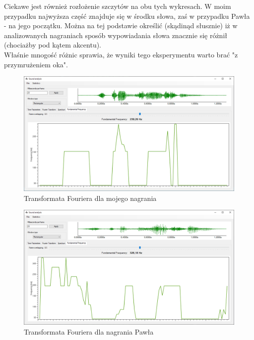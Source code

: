 \documentclass[a4paper]{article}
\begin{document}
Ciekawe jest również rozłożenie szczytów na obu tych wykresach. W moim przypadku najwyższa część znajduje się w środku słowa, zaś w przypadku Pawła - na jego początku. Można na tej podstawie określić (skądinąd słusznie) iż w analizowanych nagraniach sposób wypowiadania słowa znacznie się różnił (chociażby pod kątem akcentu).\\Właśnie mnogość różnic sprawia, że wyniki tego eksperymentu warto brać "z przymrużeniem oka".
\begin{figure}[H]
  \centering
  \includegraphics[width=0.86\linewidth]{images/14frequencyMy.png}
  \caption{Transformata Fouriera dla mojego nagrania}
\end{figure}
\begin{figure}[H]
  \centering
  \includegraphics[width=0.86\linewidth]{images/15frequencyBro.png}
  \caption{Transformata Fouriera dla nagrania Pawła}
\end{figure}
\end{document}
